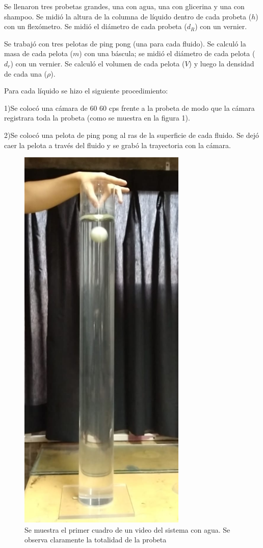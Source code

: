 \documentclass[a4paper]{article}
\begin{document}
Se llenaron tres probetas grandes, una con agua, una con glicerina y una con shampoo. Se midió la altura de la columna de líquido dentro de cada probeta ($h$) con un flexómetro. Se midió el diámetro de cada probeta ($d_{R}$) con un vernier.

Se trabajó con tres pelotas de ping pong (una para cada fluido). Se calculó la masa de cada pelota ($m$) con una báscula; se midió el diámetro de cada pelota ($d_{r}$) con un vernier. Se calculó el volumen de cada pelota ($V$) y luego la densidad de cada una ($\rho$).

Para cada líquido se hizo el siguiente procedimiento:

1)Se colocó una cámara de 60 60 cps frente a la probeta de modo que la cámara registrara toda la probeta (como se muestra en la figura 1).

2)Se colocó una pelota de ping pong al ras de la superficie de cada fluido. Se dejó caer la pelota a través del fluido y se grabó la trayectoria con la cámara.

\begin{figure}[H]
    \centering
    \includegraphics[width=8cm]{Viscosidadsistema.jpg}
    \caption{Se muestra el primer cuadro de un video del sistema con agua. Se observa claramente la totalidad de la probeta}
\end{figure}
\end{document}
